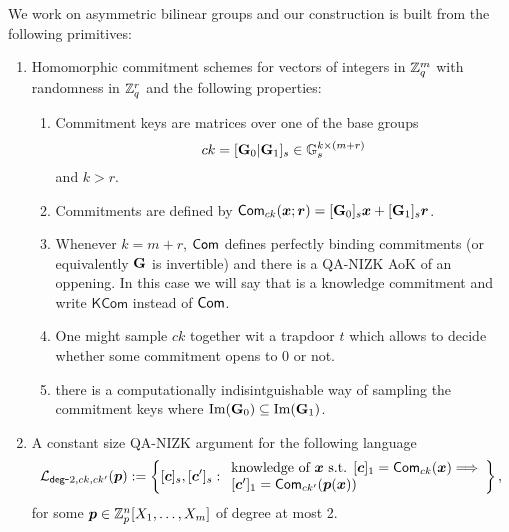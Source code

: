 We work on asymmetric bilinear groups and our construction is built from the following primitives:
\begin{enumerate}
\item Homomorphic commitment schemes for vectors of integers in $\mathbb{Z}_q^m$ with randomness in $\mathbb{Z}_q^r$ and the following properties:
\begin{enumerate}
	\item Commitment keys are matrices over one of the base groups $$ck=[\mathbf{{G}}_0|\mathbf{{G}}_1]_s\in\mathbb{G}_s^{k\times(m+r)}$$ and $k>r$.
	\item Commitments are defined by $\mathsf{Com}_{ck}({\boldsymbol{x}};{\boldsymbol{r}})=[\mathbf{{G}}_0]_s{\boldsymbol{x}}+[\mathbf{{G}}_1]_s{\boldsymbol{r}}$.		\item Whenever $k=m+r$, $\mathsf{Com}$ defines perfectly binding commitments (or equivalently $\mathbf{{G}}$ is invertible) and 	                   there is a QA-NIZK AoK of an oppening. In this case we will say that is a knowledge commitment and write $\mathsf{KCom}$ instead of $\mathsf{Com}$.
\item One might sample $ck$ together wit a trapdoor $t$ which allows to decide whether some commitment opens to $0$ or not.
	\item there is a computationally indisintguishable way of sampling the commitment keys where $\mathrm{Im}(\mathbf{{G}}_0)\subseteq\mathrm{Im}\mathrm(\mathbf{{G}}_1)$.
\end{enumerate}
\item A constant size QA-NIZK argument for the following language
$$
\mathcal{L}_{\mathsf{deg}\mbox{-}2,ck,ck'}({\boldsymbol{p}}):=\left\{[{\boldsymbol{c}}]_s,[{\boldsymbol{c}}']_s:
\begin{array}{l}
		\text{knowledge of } {\boldsymbol{x}} \text{ s.t. }
		{[{\boldsymbol{c}}]_1=\mathsf{Com}_{ck}({\boldsymbol{x}})}
		\Longrightarrow\\
		{[{\boldsymbol{c}}']_1=\mathsf{Com}_{ck'}({\boldsymbol{p}}({\boldsymbol{x}}))}
	\end{array}\right\},
$$
for some ${\boldsymbol{p}}\in\mathbb{Z}_p^n[X_1,\ldots,X_m]$ of degree at most 2.


\end{enumerate}
